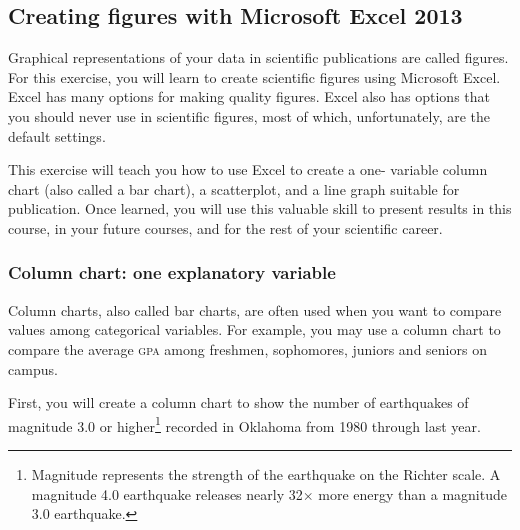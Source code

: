 \documentclass[12pt, hidelinks]{exam}
\begin{document}
\subsection*{Creating figures with Microsoft Excel 2013\texttrademark}

Graphical representations of your data in scientific publications are called figures. For this exercise, you will learn to create scientific figures using Microsoft Excel. Excel has many options for making quality figures. Excel also has options that you should never use in scientific figures, most of which, unfortunately, are the default settings.  

This exercise will teach you how to use Excel to create a one-%
variable column chart (also called a bar chart), a scatterplot, and a line graph suitable for publication. Once learned, you will use this valuable skill to present results in this course, in your future courses, and for the rest of your scientific career. 

\subsubsection*{Column chart: one explanatory variable}

Column charts, also called bar charts, are often used when you want to compare values among categorical variables. For example, you may use a column chart to compare the average \textsc{gpa} among freshmen, sophomores, juniors and seniors on campus. 

First, you will create a column chart to show the number of earthquakes of magnitude 3.0 or higher\footnote{Magnitude represents the strength of the earthquake on the Richter scale. A magnitude 4.0 earthquake releases nearly 32$\times$ more energy than a magnitude 3.0 earthquake.} recorded in Oklahoma from 1980 through last year. \bigskip
\end{document}

